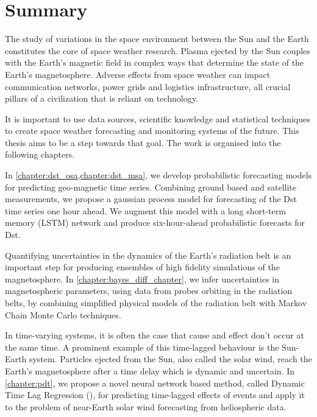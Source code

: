 \chapter*{Summary}\label{chapter:abstract}

\begin{center}

    \textbf{\doctitle}

    \textit{\docsubtitle}


\end{center}

The study of variations in the space environment between the Sun and the Earth 
constitutes the core of space weather research. Plasma ejected by the 
Sun couples with the Earth’s magnetic field in complex ways that determine 
the state of the Earth's magnetosphere. Adverse effects from space weather can 
impact communication networks, power grids and logistics infrastructure, all 
crucial pillars of a civilization that is reliant on technology.

It is important to use data sources, scientific knowledge and statistical 
techniques to create space weather forecasting and monitoring systems of the 
future. This thesis aims to be a step towards that goal. The work is organised 
into the following chapters.

In \cref{chapter:dst_osa,chapter:dst_msa}, we develop probabilistic forecasting 
models for predicting geo-magnetic time series. Combining ground based and 
satellite measurements, we propose a gaussian process model for forecasting of 
the Dst time series one hour ahead. We augment this model with a 
long short-term memory (LSTM) network and produce six-hour-ahead probabilistic 
forecasts for Dst.

Quantifying uncertainties in the dynamics of the Earth's radiation belt is an 
important step for producing ensembles of high fidelity simulations of the 
magnetosphere. In \cref{chapter:bayes_diff_chapter}, we infer uncertainties in 
magnetospheric parameters, using data from probes orbiting in the radiation 
belts, by combining simplified physical models of the radiation belt with 
Markov Chain Monte Carlo techniques.

In time-varying systems, it is often the case that cause and effect don't occur
at the same time. A prominent example of this time-lagged behaviour is the 
Sun-Earth system. Particles ejected from the Sun, also called the solar wind, 
reach the Earth's magnetosphere after a time delay which is dynamic and 
uncertain. In \cref{chapter:pdt}, we propose a novel neural network based 
method, called Dynamic Time Lag Regression (\XX), for predicting time-lagged 
effects of events and apply it to the problem of near-Earth solar wind 
forecasting from heliospheric data.
